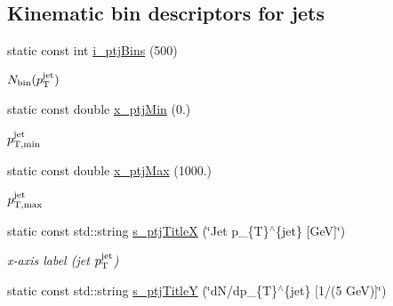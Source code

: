 \subsection*{Kinematic bin descriptors for jets}
\begin{CompactItemize}
\item 
\hypertarget{namespaceHistGroupCfg_d9de445aa5077cb10876ab1afdfe2cf2}{
static const int \hyperlink{namespaceHistGroupCfg_d9de445aa5077cb10876ab1afdfe2cf2}{i\_\-ptj\-Bins} (500)}
\label{namespaceHistGroupCfg_d9de445aa5077cb10876ab1afdfe2cf2}

\begin{CompactList}\small\item\em $N_{\rm bin}(p_{\rm T}^{\rm jet})$ \item\end{CompactList}\item 
\hypertarget{namespaceHistGroupCfg_9ea04bec58f32922334e279141a1f652}{
static const double \hyperlink{namespaceHistGroupCfg_9ea04bec58f32922334e279141a1f652}{x\_\-ptj\-Min} (0.)}
\label{namespaceHistGroupCfg_9ea04bec58f32922334e279141a1f652}

\begin{CompactList}\small\item\em $p_{\rm T,min}^{\rm jet}$ \item\end{CompactList}\item 
\hypertarget{namespaceHistGroupCfg_f54a6201f317d80eb3e2a51097603e99}{
static const double \hyperlink{namespaceHistGroupCfg_f54a6201f317d80eb3e2a51097603e99}{x\_\-ptj\-Max} (1000.)}
\label{namespaceHistGroupCfg_f54a6201f317d80eb3e2a51097603e99}

\begin{CompactList}\small\item\em $p_{\rm T,max}^{\rm jet}$ \item\end{CompactList}\item 
\hypertarget{namespaceHistGroupCfg_e85be9cfa2996ef8f2a7108eaf643d56}{
static const std::string \hyperlink{namespaceHistGroupCfg_e85be9cfa2996ef8f2a7108eaf643d56}{s\_\-ptj\-Title\-X} (\char`\"{}Jet p\_\-\{T\}$^\wedge$\{jet\} \mbox{[}Ge\-V\mbox{]}\char`\"{})}
\label{namespaceHistGroupCfg_e85be9cfa2996ef8f2a7108eaf643d56}

\begin{CompactList}\small\item\em x-axis label (jet $p_{\rm T}^{\rm jet}$) \item\end{CompactList}\item 
\hypertarget{namespaceHistGroupCfg_d8774a1e711630045e483b94761e0e75}{
static const std::string \hyperlink{namespaceHistGroupCfg_d8774a1e711630045e483b94761e0e75}{s\_\-ptj\-Title\-Y} (\char`\"{}d\-N/dp\_\-\{T\}$^\wedge$\{jet\} \mbox{[}1/(5 Ge\-V)\mbox{]}\char`\"{})}
\label{namespaceHistGroupCfg_d8774a1e711630045e483b94761e0e75}


\end{CompactItemize}
